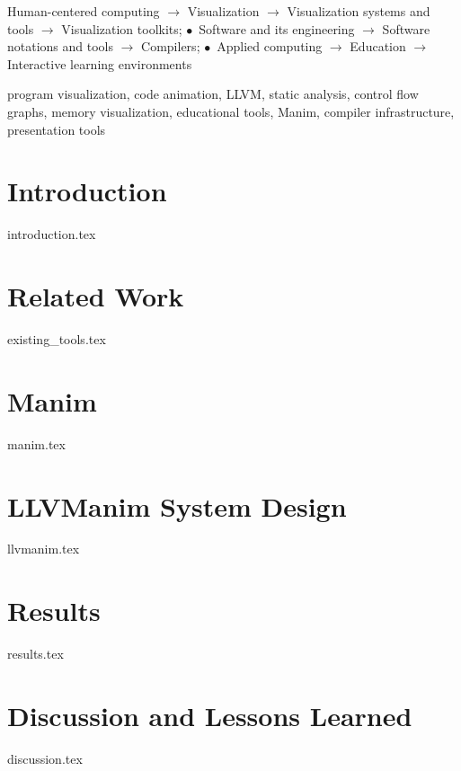 \documentclass[conference]{IEEEtran}
\begin{document}
\begin{IEEEconcepts}
Human-centered computing $\rightarrow$ Visualization $\rightarrow$ Visualization systems and tools $\rightarrow$ Visualization toolkits;
$\bullet$~Software and its engineering $\rightarrow$ Software notations and tools $\rightarrow$ Compilers;
$\bullet$~Applied computing $\rightarrow$ Education $\rightarrow$ Interactive learning environments
\end{IEEEconcepts}

\begin{IEEEkeywords}
program visualization, code animation, LLVM, static analysis, control flow graphs, memory visualization, educational tools, Manim, compiler infrastructure, presentation tools
\end{IEEEkeywords}

\section{Introduction}
\label{sec:introduction}
{introduction.tex}

\section{Related Work}
\label{sec:related_work}
{existing_tools.tex}

\section{Manim}
\label{sec:manim}
{manim.tex}

\section{LLVManim System Design}
\label{sec:llvmanim}
{llvmanim.tex}

\section{Results}
\label{sec:results}
{results.tex}

\section{Discussion and Lessons Learned}
\label{sec:discussion}
{discussion.tex}
\end{document}

